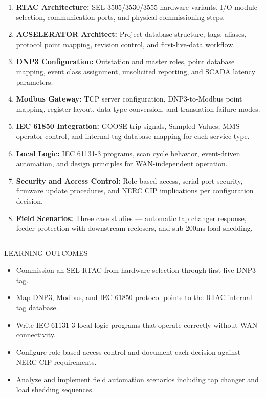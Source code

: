 \documentclass[10pt]{article}
\begin{document}
\begin{enumerate}\small
  \item \textbf{RTAC Architecture:} SEL-3505/3530/3555 hardware variants, I/O module selection, communication ports, and physical commissioning steps.
  \item \textbf{ACSELERATOR Architect:} Project database structure, tags, aliases, protocol point mapping, revision control, and first-live-data workflow.
  \item \textbf{DNP3 Configuration:} Outstation and master roles, point database mapping, event class assignment, unsolicited reporting, and SCADA latency parameters.
  \item \textbf{Modbus Gateway:} TCP server configuration, DNP3-to-Modbus point mapping, register layout, data type conversion, and translation failure modes.
  \item \textbf{IEC 61850 Integration:} GOOSE trip signals, Sampled Values, MMS operator control, and internal tag database mapping for each service type.
  \item \textbf{Local Logic:} IEC 61131-3 programs, scan cycle behavior, event-driven automation, and design principles for WAN-independent operation.
  \item \textbf{Security and Access Control:} Role-based access, serial port security, firmware update procedures, and NERC CIP implications per configuration decision.
  \item \textbf{Field Scenarios:} Three case studies — automatic tap changer response, feeder protection with downstream reclosers, and sub-200ms load shedding.
\end{enumerate}

\smallskip
{\color{rnavy}\rule{\linewidth}{0.4pt}}
\smallskip
{\small\sffamily\color{rgray}\MakeUppercase{Learning Outcomes}}
\smallskip

\begin{itemize}\small
  \item Commission an SEL RTAC from hardware selection through first live DNP3 tag.
  \item Map DNP3, Modbus, and IEC 61850 protocol points to the RTAC internal tag database.
  \item Write IEC 61131-3 local logic programs that operate correctly without WAN connectivity.
  \item Configure role-based access control and document each decision against NERC CIP requirements.
  \item Analyze and implement field automation scenarios including tap changer and load shedding sequences.
\end{itemize}
\end{document}
